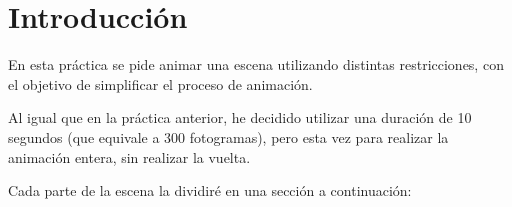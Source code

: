 
\section{Introducción}

En esta práctica se pide animar una escena utilizando distintas restricciones, con el objetivo de simplificar el proceso de animación. 

\bigskip

Al igual que en la práctica anterior, he decidido utilizar una duración de 10 segundos (que equivale a 300 fotogramas), pero esta vez para realizar la animación entera, sin realizar la vuelta.

\bigskip

Cada parte de la escena la dividiré en una sección a continuación: